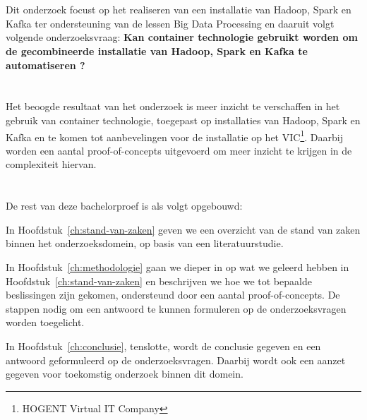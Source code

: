 \section{}%
\label{sec:onderzoeksvraag}
Dit onderzoek focust op het realiseren van een installatie van Hadoop, Spark en Kafka ter ondersteuning van de lessen Big Data Processing en daaruit volgt volgende onderzoeksvraag:
\textbf{Kan container technologie gebruikt worden om de gecombineerde installatie van Hadoop, Spark en Kafka te automatiseren ?}

\section{}%
\label{sec:onderzoeksdoelstelling}

Het beoogde resultaat van het onderzoek is meer inzicht te verschaffen in het gebruik van container technologie, toegepast op  installaties van Hadoop, Spark en Kafka en te komen tot aanbevelingen voor de installatie op het VIC\footnote{HOGENT Virtual IT Company}. Daarbij worden een aantal proof-of-concepts uitgevoerd om meer inzicht te krijgen in de complexiteit hiervan.

\section{}%
\label{sec:opzet-bachelorproef}

De rest van deze bachelorproef is als volgt opgebouwd:

In Hoofdstuk~\ref{ch:stand-van-zaken} geven we een overzicht van de stand van zaken binnen het onderzoeksdomein, op basis van een literatuurstudie.

In Hoofdstuk~\ref{ch:methodologie} gaan we dieper in op wat we geleerd hebben in Hoofdstuk~\ref{ch:stand-van-zaken} en beschrijven we hoe we tot bepaalde beslissingen zijn gekomen, ondersteund door een aantal proof-of-concepts. De stappen nodig om een antwoord te kunnen formuleren op de onderzoeksvragen worden toegelicht.


In Hoofdstuk~\ref{ch:conclusie}, tenslotte, wordt de conclusie gegeven en een antwoord geformuleerd op de onderzoeksvragen. Daarbij wordt ook een aanzet gegeven voor toekomstig onderzoek binnen dit domein.
